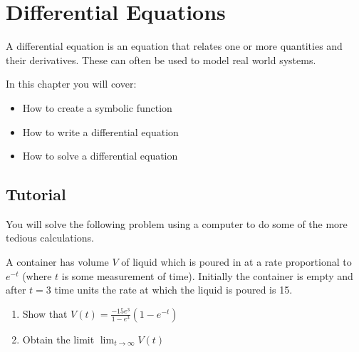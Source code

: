 \chapter{Differential Equations}
\label{\detokenize{tools-for-mathematics/09-differential-equations/introduction/main:differential-equations}}\label{\detokenize{tools-for-mathematics/09-differential-equations/introduction/main::doc}}

A differential equation is an equation that relates one or more quantities and
their derivatives. These can often be used to model real world systems.

\begin{note}
In this chapter you will cover:
\begin{itemize}
\item 

How to create a symbolic function

\item 

How to write a differential equation

\item 

How to solve a differential equation

\end{itemize}
\end{note}





\section{Tutorial}
\label{\detokenize{tools-for-mathematics/09-differential-equations/tutorial/main:tutorial}}\label{\detokenize{tools-for-mathematics/09-differential-equations/tutorial/main::doc}}

You will solve the following problem using a computer to do some of the more
tedious calculations.




A container has volume \(V\) of liquid which is poured in at a rate proportional
to \(e^{-t}\) (where \(t\) is some measurement of time). Initially the container is empty and
after \(t=3\) time units the rate at which the liquid is poured is 15.
\begin{enumerate}

\item 

Show that \(V(t)=\frac{-15e^{3}}{1-e^{3}}(1 - e^{-t})\)

\item 

Obtain the limit \(\lim_{t\to \infty}V(t)\)

\end{enumerate}



